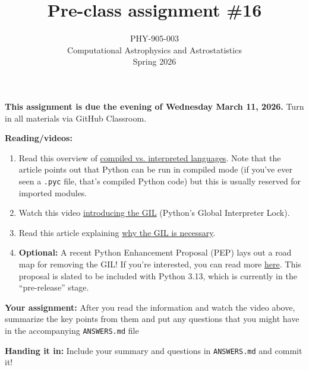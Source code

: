 \documentclass[10pt]{article}
\title{Pre-class assignment \#16}
\author{PHY-905-003\\Computational Astrophysics and
  Astrostatistics\\Spring 2026}
\date{} %
\begin{document}
 
\maketitle

\vspace{-5mm}

\noindent
\textbf{This assignment is due the evening of Wednesday March 11, 2026.}
 Turn in all materials via GitHub Classroom.

\vspace{5mm}

\noindent
\textbf{Reading/videos:}

\begin{enumerate}

\item Read this overview of
  \href{https://www.freecodecamp.org/news/compiled-versus-interpreted-languages/}{compiled
  vs. interpreted languages}.  Note that the article points out that
Python can be run in compiled mode (if you've ever seen a
\texttt{.pyc} file, that's compiled Python code) but this is usually
reserved for imported modules.

\item Watch this video
  \href{https://www.youtube.com/watch?v=XVcRQ6T9RHo}{introducing the
    GIL} (Python's Global Interpreter Lock).


\item Read this article explaining \href{https://realpython.com/python-gil/}{why the GIL is necessary}.

\item \textbf{Optional:} A recent Python Enhancement Proposal (PEP)
  lays out a road map for removing the GIL! If you're interested, you
  can read more
  \href{https://www.infoworld.com/article/3704248/python-moves-to-remove-the-gil-and-boost-concurrency.html}{here}.  This proposal is slated to be included with Python 3.13, which is currently in the ``pre-release'' stage.
  
\end{enumerate}

\noindent
\textbf{Your assignment:}  After you read the information and watch
the video above, summarize the key points from them and put any
questions that you might have in the accompanying \texttt{ANSWERS.md}
file

\noindent
\textbf{Handing it in:}
Include your summary and questions in \texttt{ANSWERS.md} and commit it!
\end{document}
